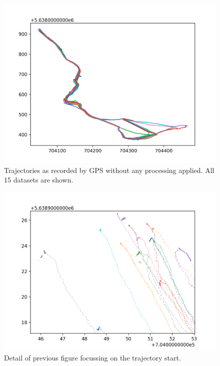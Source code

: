 \documentclass[a4]{article}
\begin{document}
\begin{figure}
  \includegraphics[width=
    \textwidth]{figures/raw_trajectories_onepanel.png}
  \caption{\label{fig:rawTraj1} Trajectories as recorded by GPS
    without any processing applied. All 15 datasets are shown.}
\end{figure}

\begin{figure}
  \includegraphics[width=
    \textwidth]{figures/raw_trajectories_onepanel_detail.png}
  \caption{\label{fig:rawTrajDetail} Detail of previous figure focussing on
    the trajectory start.}
\end{figure}
\end{document}
